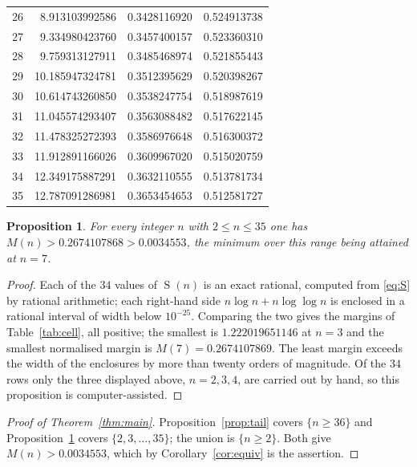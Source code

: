 \documentclass[11pt]{amsart}
\newtheorem{proposition}[theorem]{Proposition}
\DeclareMathOperator{\Sfun}{S}
\begin{document}
\begin{table}[htbp]
\begin{tabular}{r@{\qquad}r@{\qquad}l@{\qquad}l}
26 &  8.913103992586 & 0.3428116920 & 0.524913738\\
27 &  9.334980423760 & 0.3457400157 & 0.523360310\\
28 &  9.759313127911 & 0.3485468974 & 0.521855443\\
29 & 10.185947324781 & 0.3512395629 & 0.520398267\\
30 & 10.614743260850 & 0.3538247754 & 0.518987619\\
31 & 11.045574293407 & 0.3563088482 & 0.517622145\\
32 & 11.478325272393 & 0.3586976648 & 0.516300372\\
33 & 11.912891166026 & 0.3609967020 & 0.515020759\\
34 & 12.349175887291 & 0.3632110555 & 0.513781734\\
35 & 12.787091286981 & 0.3653454653 & 0.512581727\\
\hline
\end{tabular}
\end{table}

\begin{proposition}\label{prop:cell}
For every integer $n$ with $2\le n\le35$ one has
$M(n)>0.2674107868>0.0034553$, the minimum over this range being attained at $n=7$.
\end{proposition}

\begin{proof}
Each of the $34$ values of $\Sfun(n)$ is an exact rational, computed from \eqref{eq:S} by
rational arithmetic; each right-hand side $n\log n+n\log\log n$ is enclosed in a rational
interval of width below $10^{-25}$. Comparing the two gives the margins of
Table~\ref{tab:cell}, all positive; the smallest is $1.222019651146$ at $n=3$ and the
smallest normalised margin is $M(7)=0.2674107869$. The least margin exceeds the width of
the enclosures by more than twenty orders of magnitude. Of the $34$ rows only the three
displayed above, $n=2,3,4$, are carried out by hand, so this proposition is
computer-assisted.
\end{proof}

\begin{proof}[Proof of Theorem~\ref{thm:main}]
Proposition~\ref{prop:tail} covers $\{n\ge36\}$ and Proposition~\ref{prop:cell} covers
$\{2,3,\ldots,35\}$; the union is $\{n\ge2\}$. Both give $M(n)>0.0034553$, which by
Corollary~\ref{cor:equiv} is the assertion.
\end{proof}
\end{document}
